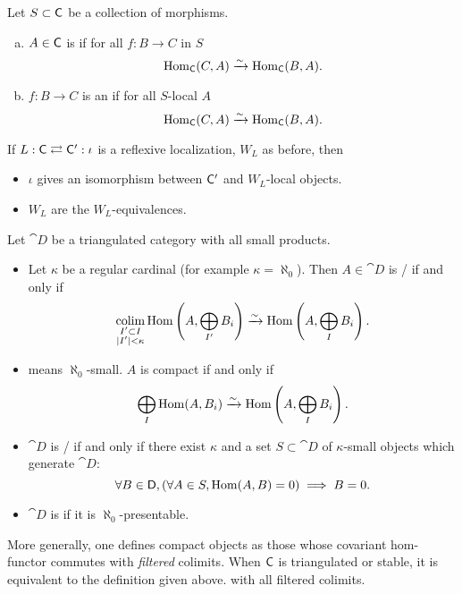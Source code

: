 \begin{definition}
Let $S\subset \mathsf{C}$ be a collection of morphisms.
\begin{enumerate}[a)]
\item $A\in \mathsf{C}$ is  if for all $f:B\to C$ in $S$
\[
\operatorname{Hom}_\mathsf{C}(C,A) \xrightarrow{\sim} \operatorname{Hom}_\mathsf{C}(B,A).
\]
\item $f:B\to C$ is an  if for all $S$-local $A$
\[
\operatorname{Hom}_{\mathsf{C}}(C,A) \xrightarrow{\sim} \operatorname{Hom}_\mathsf{C}(B,A).
\]
\end{enumerate}
\end{definition}
\begin{lemma}
If $L:\mathsf{C} \rightleftarrows \mathsf{C}':\iota$ is a reflexive localization, $W_L$ as before, then
\begin{itemize}
\item $\iota$ gives an isomorphism between $\mathsf{C}'$ and $W_L$-local objects.
\item $W_L$ are the $W_L$-equivalences.
\end{itemize}
\end{lemma}
\begin{definition}
Let $\cat{D}$ be a triangulated category with all small products.
\begin{itemize}
\item Let $\kappa$ be a regular cardinal (for example $\kappa=\aleph_0$). Then $A\in
\cat{D}$ is / if and only if
\[
\operatorname*{colim}_{\substack{I' \subset I \\ |I'|<\kappa}} \operatorname{Hom}\left( A,\bigoplus_{I'}B_i \right)
\xrightarrow{\sim} \operatorname{Hom}\left( A, \bigoplus_I B_i \right)
.\]
\item {} means $\aleph_0$-small. $A$ is compact if and only if
\[
\bigoplus_I \operatorname{Hom}(A,B_i) \xrightarrow{\sim} \operatorname{Hom} \left( A,\bigoplus_{I}B_i \right)
.\]
\item $\cat{D}$ is / if and only if there exist
$\kappa$ and a set $S\subset \cat{D}$ of $\kappa$-small objects which generate $\cat{D}$:
\[
\forall B\in \mathsf{D},\left( \forall A\in S, \operatorname{Hom}(A,B)=0 \right) \implies B = 0
.\]
\item $\cat{D}$ is  if it is $\aleph_0$-presentable.
\end{itemize}
More generally, one defines compact objects as those whose covariant
hom-functor commutes with \textit{filtered} colimits. When $\mathsf{C}$ is triangulated or
stable, it is equivalent to the definition given above.
with all filtered colimits.
\end{definition}

